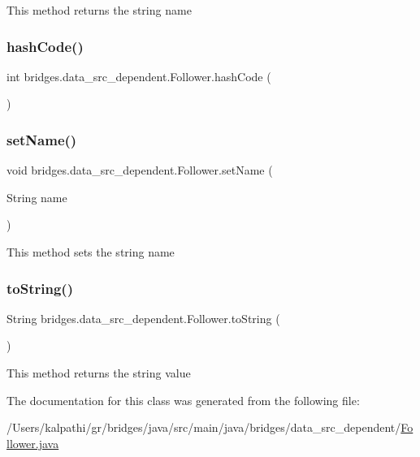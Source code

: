 This method returns the string name \mbox{\label{classbridges_1_1data__src__dependent_1_1_follower_a36f11800d7769ef93875e00afa984e19}} 
\subsubsection{\texorpdfstring{hashCode()}{hashCode()}}
{\footnotesize\ttfamily int bridges.\+data\+\_\+src\+\_\+dependent.\+Follower.\+hash\+Code (\begin{DoxyParamCaption}{ }\end{DoxyParamCaption})}

\mbox{\label{classbridges_1_1data__src__dependent_1_1_follower_a3568ebd0132d28f285448b3ce0468199}} 
\subsubsection{\texorpdfstring{setName()}{setName()}}
{\footnotesize\ttfamily void bridges.\+data\+\_\+src\+\_\+dependent.\+Follower.\+set\+Name (\begin{DoxyParamCaption}\item[{String}]{name }\end{DoxyParamCaption})}

This method sets the string name \mbox{\label{classbridges_1_1data__src__dependent_1_1_follower_ac01fd01fb2bbbe4eaac327bca9d6a368}} 
\subsubsection{\texorpdfstring{toString()}{toString()}}
{\footnotesize\ttfamily String bridges.\+data\+\_\+src\+\_\+dependent.\+Follower.\+to\+String (\begin{DoxyParamCaption}{ }\end{DoxyParamCaption})}

This method returns the string value 

The documentation for this class was generated from the following file\+:\begin{DoxyCompactItemize}
\item 
/\+Users/kalpathi/gr/bridges/java/src/main/java/bridges/data\+\_\+src\+\_\+dependent/\mbox{\hyperlink{_follower_8java}{Follower.\+java}}\end{DoxyCompactItemize}

